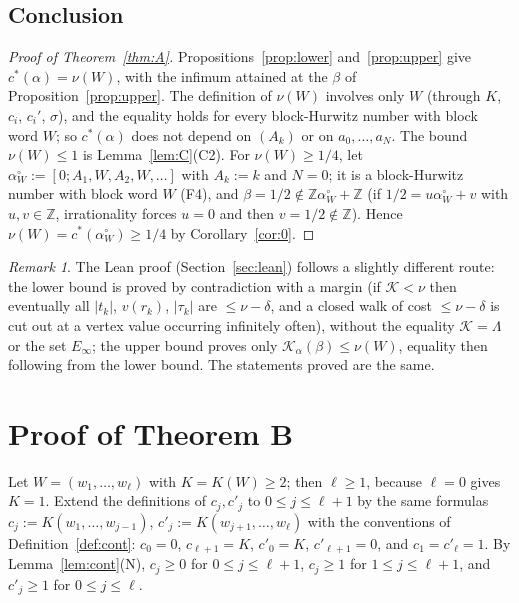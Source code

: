 \documentclass[11pt]{amsart}
\theoremstyle{definition}
\theoremstyle{remark}
\newtheorem{remark}[theorem]{Remark}
\newcommand{\Z}{\mathbb{Z}}
\newcommand{\KL}{\mathcal{K}}
\begin{document}
\subsection{Conclusion}\label{subsec:conclA}
\begin{proof}[Proof of Theorem~\ref{thm:A}]
Propositions~\ref{prop:lower} and~\ref{prop:upper} give $c^*(\alpha)=\nu(W)$, with the infimum attained at the
$\beta$ of Proposition~\ref{prop:upper}. The definition of $\nu(W)$ involves only $W$ (through $K$, $c_i$, $c_i'$,
$\sigma$), and the equality holds for every block-Hurwitz number with block word $W$; so $c^*(\alpha)$ does not depend
on $(A_k)$ or on $a_0,\dots,a_N$. The bound $\nu(W)\le1$ is Lemma~\ref{lem:C}(C2). For $\nu(W)\ge1/4$, let
$\alpha_W^\circ:=[0;A_1,W,A_2,W,\dots]$ with $A_k:=k$ and $N=0$; it is a block-Hurwitz number with block word $W$
(F4), and $\beta=1/2\notin\Z\alpha_W^\circ+\Z$ (if $1/2=u\alpha_W^\circ+v$ with $u,v\in\Z$, irrationality forces $u=0$ and
then $v=1/2\notin\Z$). Hence $\nu(W)=c^*(\alpha_W^\circ)\ge1/4$ by Corollary~\ref{cor:0}.
\end{proof}

\begin{remark}\label{rem:lean-route}
The Lean proof (Section~\ref{sec:lean}) follows a slightly different route: the lower bound is proved by
contradiction with a margin (if $\KL<\nu$ then eventually all $|t_k|$, $v(r_k)$, $|\tau_k|$ are $\le\nu-\delta$, and a
closed walk of cost $\le\nu-\delta$ is cut out at a vertex value occurring infinitely often), without the equality
$\KL=\Lambda$ or the set $E_\infty$; the upper bound proves only $\KL_\alpha(\beta)\le\nu(W)$, equality then following
from the lower bound. The statements proved are the same.
\end{remark}

\section{Proof of Theorem B}\label{sec:thmB}

Let $W=(w_1,\dots,w_\ell)$ with $K=K(W)\ge2$; then $\ell\ge1$, because $\ell=0$ gives $K=1$. Extend the definitions of
$c_j,c'_j$ to $0\le j\le\ell+1$ by the same formulas $c_j:=K(w_1,\dots,w_{j-1})$, $c'_j:=K(w_{j+1},\dots,w_\ell)$
with the conventions of Definition~\ref{def:cont}: $c_0=0$, $c_{\ell+1}=K$, $c'_0=K$, $c'_{\ell+1}=0$, and
$c_1=c'_\ell=1$. By Lemma~\ref{lem:cont}(N), $c_j\ge0$ for $0\le j\le\ell+1$, $c_j\ge1$ for $1\le j\le\ell+1$, and
$c'_j\ge1$ for $0\le j\le\ell$.
\end{document}
